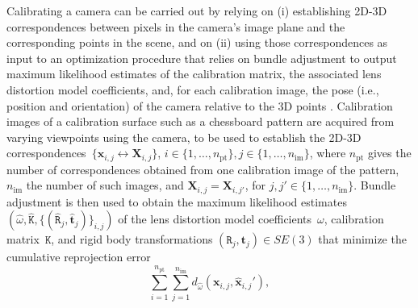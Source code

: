 \documentclass[review]{elsarticle}
\begin{document}
Calibrating a camera can be carried out by relying on (i) establishing 2D-3D correspondences between pixels in the camera's image plane and the corresponding points in the scene, and on (ii) using those correspondences as input to an optimization procedure that relies on bundle adjustment \cite{triggs1999bundle} to output maximum likelihood estimates of the calibration matrix, the associated lens distortion model coefficients, and, for each calibration image, the pose (i.e., position and orientation) of the camera relative to the 3D points \cite{Hartley2004,zhang2000flexible}. Calibration images of a calibration surface such as a chessboard pattern are acquired from varying viewpoints using the camera, to be used to establish the 2D-3D correspondences~$\{\mathbf{x}_{i,j} \leftrightarrow \mathbf{X}_{i,j}\}$, $i \in \{ 1, \dots, n_\text{pt} \}, j \in \{ 1, \dots, n_\text{im} \}$, where $n_\text{pt}$ gives the number of correspondences obtained from one calibration image of the pattern, $n_\text{im}$ the number of such images, and $\mathbf{X}_{i,j} = \mathbf{X}_{i,j'}$, for $j, j' \in \{ 1, \dots, n_\text{im} \}$. Bundle adjustment is then used to obtain the maximum likelihood estimates~$(\hat{\omega}, \hat{\mathtt{K}}, \{(\hat{\mathtt{R}}_j, \hat{\mathbf{t}}_j)\}_{i,j})$ of the lens distortion model coefficients~$\omega$, calibration matrix~$\mathtt{K}$, and rigid body transformations $(\mathtt{R}_j, \mathbf{t}_j) \in SE(3)$ that minimize the cumulative reprojection error
\begin{equation}
\sum_{i=1}^{n_\text{pt}} \sum_{j=1}^{n_\text{im}} d_{\hat{\omega}}(\mathbf{x}_{i,j}, \hat{\mathbf{x}}_{i,j}'),
\label{re}
\end{equation}
\end{document}
